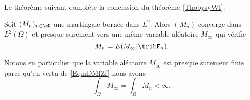 Le théorème suivant complète la conclusion du théorème \ref{ThobysyWI}.
\begin{theorem} \label{ThofcttYW}
    Soit \( (M_n)_{n\in \eN}\) une martingale bornée dans \( L^2\). Alors \( (M_n)\) converge dans \( L^2(\Omega)\) et presque surement vers une même variable aléatoire \( M_{\infty}\) qui vérifie
    \begin{equation}        \label{EqmDMfZf}
        M_n=E(M_{\infty}|\tribF_n).
    \end{equation}
\end{theorem}

Notons en particulier que la variable aléatoire \( M_{\infty}\) est presque surement finie parce qu'en vertu de \eqref{EqmDMfZf} nous avons
\begin{equation}
    \int_{\Omega}M_{\infty}=\int_{\Omega}M_n<\infty.
\end{equation}


